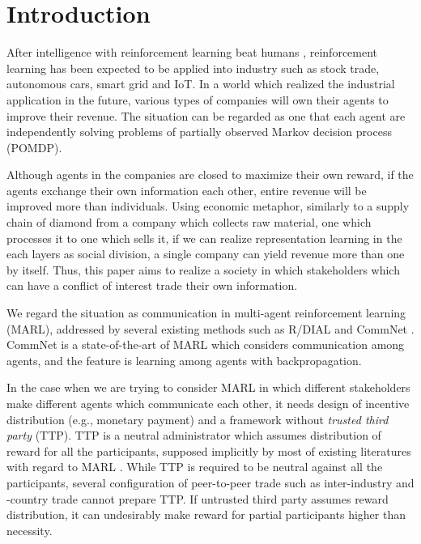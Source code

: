 \section{Introduction}

After intelligence with reinforcement learning beat humans \citep{tesauro1995temporal,mnih2015human,silver2016mastering}, reinforcement learning has been expected to be applied into industry such as stock trade, autonomous cars, smart grid and IoT. 
In a world which realized the industrial application in the future, various types of companies will own their agents to improve their revenue.
The situation can be regarded as one that each agent are independently solving problems of partially observed Markov decision process (POMDP).

Although agents in the companies are closed to maximize their own reward, if the agents exchange their own information each other, 
entire revenue will be improved more than individuals.
Using economic metaphor, similarly to a supply chain of diamond from a company which collects raw material, one which processes it to one which sells it, if we can realize representation learning in the each layers as social division, a single company can yield revenue more than one by itself. %
Thus, this paper aims to realize a society in which stakeholders which can have a conflict of interest trade their own information.

We regard the situation as communication in multi-agent reinforcement learning (MARL), addressed by several existing methods such as R/DIAL \citep{foerster2016learning} and CommNet \citep{sukhbaatar2016learning}.
CommNet is a state-of-the-art of MARL which considers communication among agents, 
and the feature is learning among agents with backpropagation.

In the case when we are trying to consider MARL in which different stakeholders make different agents which communicate each other, it needs design of incentive distribution (e.g., monetary payment) and a framework without {\em trusted third party} (TTP).
TTP is a neutral administrator which assumes distribution of reward for all the participants, supposed implicitly by most of existing literatures with regard to MARL \citep{agogino2006quicr,foerster2016learning,sukhbaatar2016learning}.
While TTP is required to be neutral against all the participants,
several configuration of peer-to-peer trade such as inter-industry and -country trade cannot prepare TTP.
If untrusted third party assumes reward distribution, it can undesirably make reward for partial participants higher than necessity.

